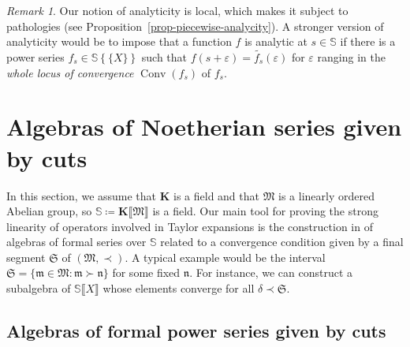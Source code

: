 \documentclass{article}
\newcommand{\assign}{\coloneqq}
\newcommand{\of}{:}
\newcommand{\tmem}[1]{{\em #1\/}}
\newcommand{\tmop}[1]{\ensuremath{\operatorname{#1}}}
\theoremstyle{remark}\newtheorem*{convention*}{Convention}
\newtheorem{remark}[theorem]{Remark}
\begin{document}
\begin{remark}
  Our notion of analyticity is local, which makes it subject to pathologies
  (see Proposition~\ref{prop-piecewise-analycity}). A stronger version of analyticity
  would be to impose that a function $f$ is analytic at $s \in \mathbb{S}$ if
  there is a power series $f_s \in \mathbb{S} \left\{ \!\! \{ X \} \!\!
  \right\}$ such that $f (s + \varepsilon) = \widetilde{f_s} (\varepsilon)$
  for $\varepsilon$ ranging in the {\tmem{whole locus of convergence}}
  $\tmop{Conv} (f_s)$ of $f_s$.
\end{remark}

\section{Algebras of Noetherian series given by cuts}

In this section, we assume that $\mathbf{K}$ is a field and that
$\mathfrak{M}$ is a linearly ordered Abelian group, so $\mathbb{S} \assign
\mathbf{K} \llbracket \mathfrak{M} \rrbracket$ is a field. Our main tool for
proving the strong linearity of operators involved in Taylor expansions is the
construction in  of algebras of formal series
over $\mathbb{S}$ related to a convergence condition given by a final segment
$\mathfrak{S}$ of $(\mathfrak{M}, \prec)$. A typical example would be the
interval $\mathfrak{S}= \{ \mathfrak{m} \in \mathfrak{M} \of \mathfrak{m}
\succ \mathfrak{n} \}$ for some fixed $\mathfrak{n}$. For instance, we can
construct a subalgebra of $\mathbb{S} \llbracket X \rrbracket$ whose elements
converge for all $\delta \prec \mathfrak{S}$.

\subsection{Algebras of formal power series given by
cuts}\label{subsection-subalgebras}
\end{document}
